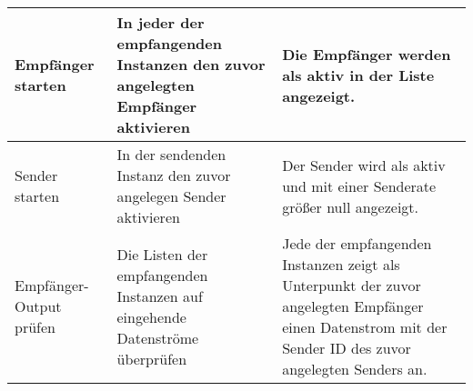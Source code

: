 \begin{table}[h]
\begin{center}
\begin{tabular}{|p{3.5cm}|p{5cm}|p{6.55cm}|}
                \hline
                    Empfänger starten &
                    In jeder der empfangenden Instanzen den zuvor angelegten
                    Empfänger aktivieren &
                    Die Empfänger werden als aktiv in der Liste angezeigt.\\
                \hline
                    Sender starten &
                    In der sendenden Instanz den zuvor angelegen Sender
                    aktivieren &
                    Der Sender wird als aktiv und mit einer Senderate größer
                    null angezeigt.\\
                \hline
                    Empfänger-Output prüfen &
                    Die Listen der empfangenden Instanzen auf eingehende
                    Datenströme überprüfen &
                    Jede der empfangenden Instanzen zeigt als Unterpunkt der
                    zuvor angelegten Empfänger einen Datenstrom mit der Sender ID
                    des zuvor angelegten Senders an.\\
                \hline
            \end{tabular}
        \end{center}
    \end{table}


